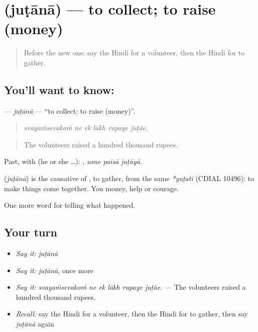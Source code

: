 \section[\texorpdfstring{\hi{जुटाना} (juṭānā)}{जुटाना (juṭānā)}]{ (juṭānā) — to collect; to raise (money)}

\label{lesson:HI-C311-jutana}



\begin{quote}
Before the new one: say the Hindi for a volunteer, then the Hindi for to gather.
\end{quote}

\subsection*{You'll want to know: }
\textbf{} — \emph{juṭānā} — \textquotedblleft{}to collect; to raise (money)\textquotedblright{}.

\begin{quote}
     
\end{quote}

\begin{quote}
\emph{svayaṁsevakoṁ ne ek lākh rupaye juṭāe.}
\end{quote}

\begin{quote}
The volunteers raised a hundred thousand rupees.
\end{quote}

Past, with  (he or she …):   , \emph{usne paisā juṭāyā}.

\begin{cousinweb}
\textbf{} (\emph{juṭānā}) is the causative of \textbf{}, to gather, from the same \emph{*yuṭati} (CDIAL 10496): to make things come together. You \textbf{ } money, help or courage.
\end{cousinweb}

\begin{grammarlens}[title={What you've built}]
One more word for telling what happened.
\end{grammarlens}

\subsection*{Your turn}
\begin{itemize}
\raggedright
  \item \emph{Say it:} \emph{juṭānā}
  \item \emph{Say it:} \emph{juṭānā}, once more
  \item \emph{Say it:} \emph{svayaṁsevakoṁ ne ek lākh rupaye juṭāe.} — The volunteers raised a hundred thousand rupees.
  \item \emph{Recall:} say the Hindi for a volunteer, then the Hindi for to gather, then say \emph{juṭānā} again
\end{itemize}

